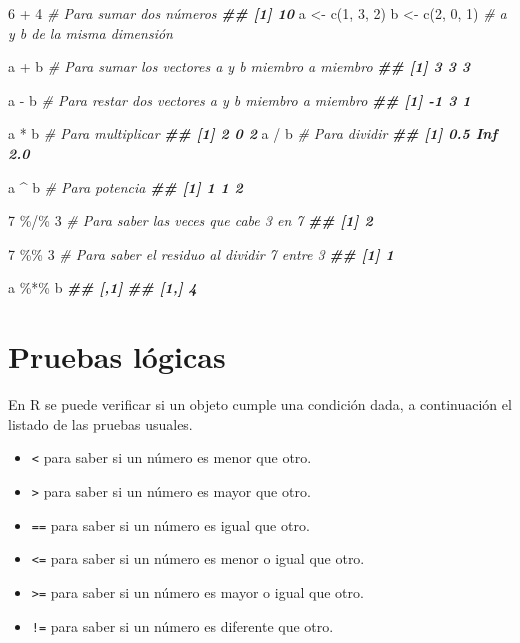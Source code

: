 \documentclass[
]{book}
\newenvironment{Shaded}{\begin{snugshade}}{\end{snugshade}}
\newcommand{\CommentTok}[1]{\textcolor[rgb]{0.56,0.35,0.01}{\textit{#1}}}
\newcommand{\DecValTok}[1]{\textcolor[rgb]{0.00,0.00,0.81}{#1}}
\newcommand{\DocumentationTok}[1]{\textcolor[rgb]{0.56,0.35,0.01}{\textbf{\textit{#1}}}}
\newcommand{\FunctionTok}[1]{\textcolor[rgb]{0.00,0.00,0.00}{#1}}
\newcommand{\NormalTok}[1]{#1}
\newcommand{\OtherTok}[1]{\textcolor[rgb]{0.56,0.35,0.01}{#1}}
\newcommand{\SpecialCharTok}[1]{\textcolor[rgb]{0.00,0.00,0.00}{#1}}
\providecommand{\tightlist}{%
  \setlength{\itemsep}{0pt}\setlength{\parskip}{0pt}}
\begin{document}
\begin{Shaded}
\begin{Highlighting}[]
\DecValTok{6} \SpecialCharTok{+} \DecValTok{4}  \CommentTok{\# Para sumar dos números}
\DocumentationTok{\#\# [1] 10}
\NormalTok{a }\OtherTok{\textless{}{-}} \FunctionTok{c}\NormalTok{(}\DecValTok{1}\NormalTok{, }\DecValTok{3}\NormalTok{, }\DecValTok{2}\NormalTok{)}
\NormalTok{b }\OtherTok{\textless{}{-}} \FunctionTok{c}\NormalTok{(}\DecValTok{2}\NormalTok{, }\DecValTok{0}\NormalTok{, }\DecValTok{1}\NormalTok{)  }\CommentTok{\# a y b de la misma dimensión}

\NormalTok{a }\SpecialCharTok{+}\NormalTok{ b  }\CommentTok{\# Para sumar los vectores a y b miembro a miembro}
\DocumentationTok{\#\# [1] 3 3 3}

\NormalTok{a }\SpecialCharTok{{-}}\NormalTok{ b  }\CommentTok{\# Para restar dos vectores a y b miembro a miembro}
\DocumentationTok{\#\# [1] {-}1  3  1}

\NormalTok{a }\SpecialCharTok{*}\NormalTok{ b  }\CommentTok{\# Para multiplicar}
\DocumentationTok{\#\# [1] 2 0 2}
\NormalTok{a }\SpecialCharTok{/}\NormalTok{ b  }\CommentTok{\# Para dividir}
\DocumentationTok{\#\# [1] 0.5 Inf 2.0}

\NormalTok{a }\SpecialCharTok{\^{}}\NormalTok{ b  }\CommentTok{\# Para potencia}
\DocumentationTok{\#\# [1] 1 1 2}

\DecValTok{7} \SpecialCharTok{\%/\%} \DecValTok{3}  \CommentTok{\# Para saber las veces que cabe 3 en 7}
\DocumentationTok{\#\# [1] 2}

\DecValTok{7} \SpecialCharTok{\%\%} \DecValTok{3}  \CommentTok{\# Para saber el residuo al dividir 7 entre 3}
\DocumentationTok{\#\# [1] 1}

\NormalTok{a }\SpecialCharTok{\%*\%}\NormalTok{ b}
\DocumentationTok{\#\#      [,1]}
\DocumentationTok{\#\# [1,]    4}
\end{Highlighting}
\end{Shaded}

\hypertarget{pruebas-luxf3gicas}{%
\section{Pruebas lógicas}\label{pruebas-luxf3gicas}}

En R se puede verificar si un objeto cumple una condición dada, a continuación el listado de las pruebas usuales.

\begin{itemize}
\tightlist
\item
  \texttt{\textless{}} para saber si un número es menor que otro.
\item
  \texttt{\textgreater{}} para saber si un número es mayor que otro.
\item
  \texttt{==} para saber si un número es igual que otro.
\item
  \texttt{\textless{}=} para saber si un número es menor o igual que otro.
\item
  \texttt{\textgreater{}=} para saber si un número es mayor o igual que otro.\\
\item
  \texttt{!=} para saber si un número es diferente que otro.
\end{itemize}
\end{document}
